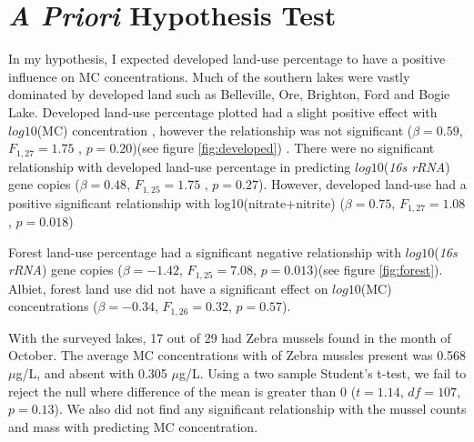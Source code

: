 





\clearpage





\section{\emph{A Priori} Hypothesis Test}


In my hypothesis, I expected developed land-use percentage to have a positive influence on MC concentrations. Much of the southern lakes were vastly dominated by developed land such as Belleville, Ore, Brighton, Ford and Bogie Lake. 
Developed land-use percentage plotted had a slight positive effect with $log10$(MC) concentration , however the relationship was not significant  ($\beta=0.59$, $F_{{1,27}}=1.75$ , $p=0.20$)(see figure \ref{fig:developed}) . There were no significant relationship with developed land-use percentage in predicting $log10$(\emph{16s rRNA}) gene copies ($\beta=0.48$, $F_{{1,25}}=1.75$ , $p=0.27$). However, developed land-use had a positive significant relationship with log10(nitrate+nitrite) ($\beta=0.75$, $F_{{1,27}}=1.08$, $p=0.018$)

Forest land-use percentage had a significant negative relationship with $log10$(\emph{16s rRNA}) gene copies ($\beta=-1.42$, $F_{{1,25}}=7.08$, $p=0.013$)(see figure \ref{fig:forest}). Albiet, forest land use did not have a significant effect on $log10$(MC) concentrations ($\beta=-0.34$, $F_{{1,26}}=0.32$, $p=0.57$).

With the surveyed lakes, 17 out of 29 had Zebra mussels found in the month of October. The average MC concentrations with  of Zebra mussles present was 0.568 $\mu$g/L, and absent with 0.305 $\mu$g/L. Using a two sample Student's t-test, we fail to reject the null where difference of the mean is greater than 0 ($t=1.14$, $df=107$, $p=0.13$). We also did not find any significant relationship with the mussel counts and mass with predicting MC concentration.

